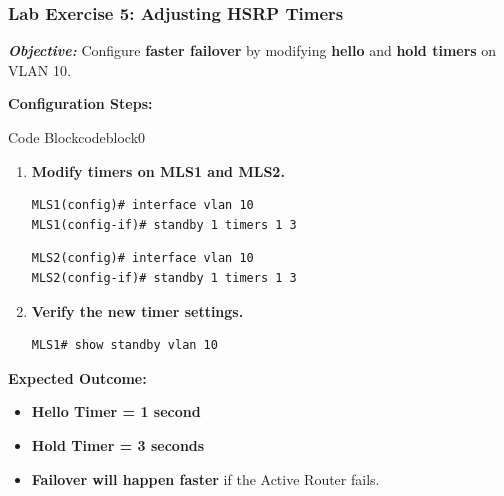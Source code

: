 \documentclass[a4paper]{book}
\begin{document}
\subsubsection{Lab Exercise 5: Adjusting HSRP Timers}
\textbf{\textit{Objective:}} Configure \textbf{faster failover} by modifying \textbf{hello} 
and \textbf{hold timers} on VLAN 10.
\vspace{1.5em}

\textbf{Configuration Steps:}


\vspace{1.5em}


\begin{ocg}{Code Block}{codeblock}{0}


\vspace{0.5cm}
\begin{enumerate}
\item \textbf{Modify timers on MLS1 and MLS2.}
\begin{lstlisting}
MLS1(config)# interface vlan 10
MLS1(config-if)# standby 1 timers 1 3
\end{lstlisting}
\begin{lstlisting}
MLS2(config)# interface vlan 10
MLS2(config-if)# standby 1 timers 1 3
\end{lstlisting}

\item \textbf{Verify the new timer settings.}
\begin{lstlisting}
MLS1# show standby vlan 10
\end{lstlisting}
\end{enumerate}
\end{ocg}




\textbf{Expected Outcome:}
\begin{itemize}
\item \textbf{Hello Timer = 1 second}
\item \textbf{Hold Timer = 3 seconds}
\item \textbf{Failover will happen faster} if the Active Router fails.
\end{itemize}


\vspace{1.5em}

\end{document}
